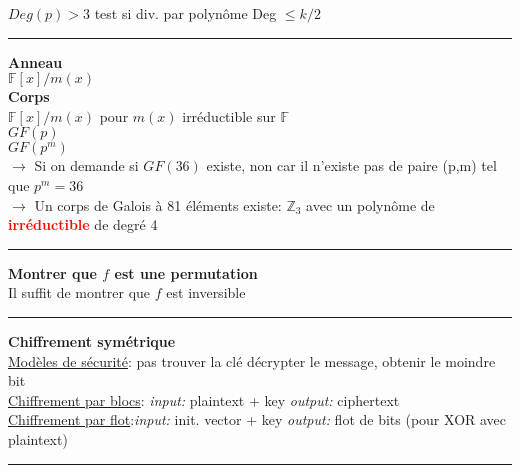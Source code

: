 \documentclass{article}
\begin{document}
\begin{multicols*}{2}
$Deg(p) > 3$ test si div. par polynôme Deg $\leq k/2$\\
\noindent\rule{7cm}{0.5pt}
\textbf{Anneau}\\
$\mathbb{F}[x]/m(x)$\\
\textbf{Corps}\\
$\mathbb{F}[x]/m(x)$ pour $m(x)$ irréductible sur $\mathbb{F}$\\
$GF(p)$ \\
$GF(p^{m})$ \\
$\rightarrow$ Si on demande si $GF(36)$ existe, non car il n'existe pas de paire (p,m) tel que $p^{m} = 36$\\
$\rightarrow$ Un corps de Galois à 81 éléments existe: $\mathbb{Z}_{3}$ avec un polynôme de \textbf{\textcolor{red}{irréductible}} de degré 4\\
\noindent\rule{7cm}{0.5pt}
\textbf{Montrer que $f$ est une permutation}\\
Il suffit de montrer que $f$ est inversible\\
\noindent\rule{7cm}{0.5pt}
\textbf{Chiffrement symétrique}\\
\underline{Modèles de sécurité}: pas trouver la clé décrypter le message, obtenir le moindre bit\\
\underline{Chiffrement par blocs}: \textit{input:} plaintext + key 
\textit{output:} ciphertext
\\
\underline{Chiffrement par flot}:\textit{input:} init. vector + key
\textit{output:} flot de bits (pour XOR avec plaintext)\\
\noindent\rule{7cm}{0.5pt}



\columnbreak



\end{multicols*}
\end{document}
